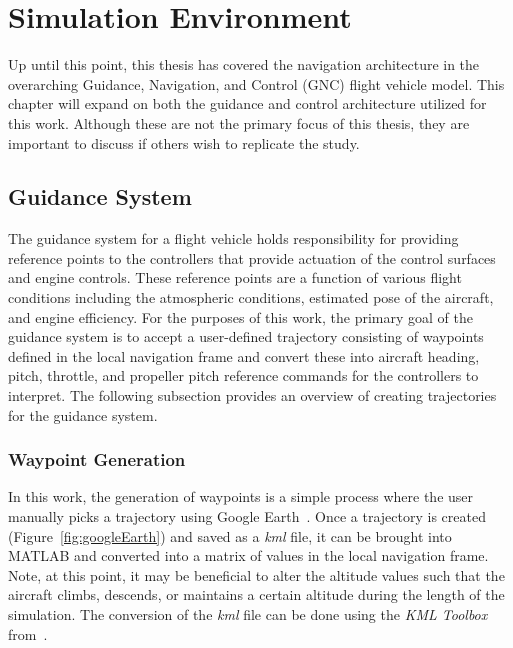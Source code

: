 \chapter{\textbf{Simulation Environment}}
 Up until this point, this thesis has covered the navigation architecture in the overarching Guidance, Navigation, and Control (GNC) flight vehicle model. This chapter will expand on both the guidance and control architecture utilized for this work. Although these are not the primary focus of this thesis, they are important to discuss if others wish to replicate the study.

\section{\textbf{Guidance System}}
The guidance system for a flight vehicle holds responsibility for providing reference points to the controllers that provide actuation of the control surfaces and engine controls. These reference points are a function of various flight conditions including the atmospheric conditions, estimated pose of the aircraft, and engine efficiency. For the purposes of this work, the primary goal of the guidance system is to accept a user-defined trajectory consisting of waypoints defined in the local navigation frame and convert these into aircraft heading, pitch, throttle, and propeller pitch reference commands for the controllers to interpret. The following subsection provides an overview of creating trajectories for the guidance system.

\subsection{\textbf{Waypoint Generation}}
In this work, the generation of waypoints is a simple process where the user manually picks a trajectory using Google Earth~\cite{GoogleEarth1969}. Once a trajectory is created (Figure~\ref{fig:googleEarth}) and saved as a \textit{kml} file, it can be brought into MATLAB and converted into a matrix of values in the local navigation frame. Note, at this point, it may be beneficial to alter the altitude values such that the aircraft climbs, descends, or maintains a certain altitude during the length of the simulation. The conversion of the \textit{kml} file can be done using the \textit{KML Toolbox} from~\cite{KMLToolboxFile1969}.

